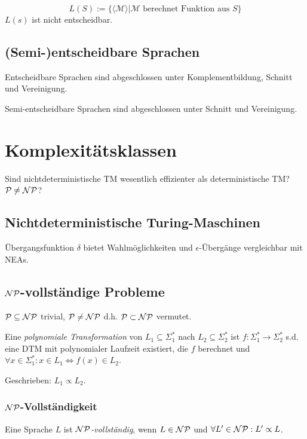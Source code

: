 \vspace*{-4mm}
\[ L(S) := \{ \langle\mathcal{M}\rangle | \mathcal{M} \text{ berechnet Funktion aus } S \} \]
$L(s)$ ist nicht entscheidbar.

\subsection*{(Semi-)entscheidbare Sprachen}

Entscheidbare Sprachen sind abgeschlossen unter Komplementbildung, Schnitt und Vereinigung.

\spacing

Semi-entscheidbare Sprachen sind abgeschlossen unter Schnitt und Vereinigung.

\section*{Komplexitätsklassen}

Sind nichtdeterministische TM wesentlich effizienter als deterministische TM? $\mathcal{P} \neq \mathcal{NP}$?

\subsection*{Nichtdeterministische Turing-Maschinen}

Übergangsfunktion $\delta$ bietet Wahlmöglichkeiten und $\epsilon$-Übergänge vergleichbar mit NEAs.

\subsection*{$\mathcal{NP}$-vollständige Probleme}

$\mathcal{P} \subseteq \mathcal{NP}$ trivial, $\mathcal{P} \neq \mathcal{NP}$ d.h. $\mathcal{P} \subset \mathcal{NP}$ vermutet.

\spacing

Eine \emph{polynomiale Transformation} von $L_1 \subseteq \Sigma_1^*$ nach $L_2 \subseteq \Sigma_2^*$ ist $f : \Sigma_1^* \to \Sigma_2^*$ s.d. eine DTM mit polynomialer Laufzeit existiert, die $f$ berechnet und $\forall x \in \Sigma_1^* : x \in L_1 \iff f(x) \in L_2$.

Geschrieben: $L_1 \propto L_2$.

\subsubsection*{$\mathcal{NP}$-Vollständigkeit}

Eine Sprache $L$ ist \emph{$\mathcal{NP}$-vollständig}, wenn $L \in \mathcal{NP}$ und $\forall L' \in  \mathcal{NP} : L' \propto L$.

